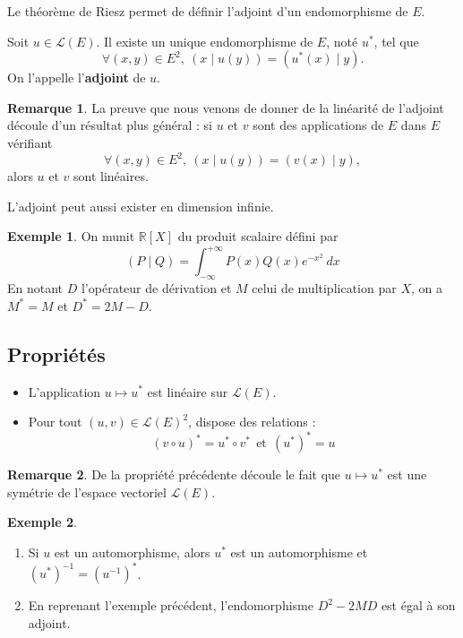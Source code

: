 \documentclass[french]{article}
\newcommand{\R}{\mathbb{R}}
\newcommand{\st}{^*}
\newcommand{\inv}{^{-1}}
\theoremstyle{plain}
\theoremstyle{definition}
\newtheorem*{ex}{Exemple}
\newtheorem*{rmq}{Remarque}
\theoremstyle{remark}
\begin{document}
Le théorème de Riesz permet de définir l'adjoint d'un endomorphisme de $E$.

\begin{thm}
	Soit $u\in\mathcal{L}(E)$. Il existe un unique endomorphisme de $E$, noté $u\st$, tel que $$\forall (x,y)\in E^2,\ (x\mid u(y))=(u\st(x)\mid y).$$ On l'appelle l'\textbf{adjoint} de $u$.
\end{thm}

\begin{rmq}
	La preuve que nous venons de donner de la linéarité de l'adjoint découle d'un résultat plus général : si $u$ et $v$ sont des applications de $E$ dans $E$ vérifiant $$\forall (x,y)\in E^2,\ (x\mid u(y))=(v(x)\mid y),$$ alors $u$ et $v$ sont linéaires.
\end{rmq}

L'adjoint peut aussi exister en dimension infinie.
\begin{ex}
	On munit $\R[X]$ du produit scalaire défini par $$(P\mid Q)=\int_{-\infty}^{+\infty}P(x)Q(x)e^{-x^2}\ dx$$ En notant $D$ l'opérateur de dérivation et $M$ celui de multiplication par $X$, on a $M\st=M$ et $D\st=2M-D$.
\end{ex}

\subsection{Propriétés}

\begin{prop}
	\begin{itemize}
		\item L'application $u\mapsto u\st$ est linéaire sur $\mathcal{L}(E)$.
		\item Pour tout $(u,v)\in \mathcal{L}(E)^2$, dispose des relations : $$(v\circ u)\st=u\st\circ v\st \ \ \text{et}\ \ (u\st)\st=u$$
	\end{itemize}
\end{prop}

\begin{rmq}
	De la propriété précédente découle le fait que $u\mapsto u\st$ est une symétrie de l'espace vectoriel $\mathcal{L}(E)$.
\end{rmq}

\begin{ex}
	\begin{enumerate}
		\item Si $u$ est un automorphisme, alors $u\st$ est un automorphisme et $(u\st)\inv=(u\inv)\st$.
		\item En reprenant l'exemple précédent, l'endomorphisme $D^2-2MD$ est égal à son adjoint. %
	\end{enumerate}
\end{ex}
\end{document}
